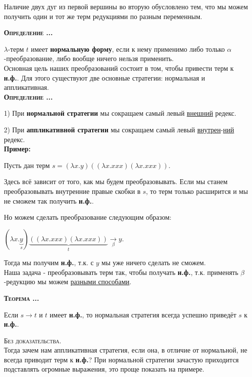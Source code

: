 \documentclass[18pt, a4paper]{extarticle}
\newcounter{par}
\newcounter{spar}
\newcounter{zap}
\newcommand{\opr}{\textbf{\textsc{Определение \thepar.\if\thespar1\thespar.\fi\thezap.\;}}\stepcounter{zap}}
\newcommand{\teor}{\textbf{\textsc{Теорема \thepar.\if\thespar1\thespar.\fi\thezap.\;}}\stepcounter{zap}}
\newcommand{\primer}{\textbf{Пример:\;}}
\newcommand{\bezdok}{\textsc{Без доказательства.}}
\newcommand{\lm}{\lambda}
\newcommand{\redb}{\underset{\beta}{\longrightarrow}}
\begin{document}
Наличие двух дуг из первой вершины во вторую обусловлено тем, что мы можем получить один и тот же терм редукциями по разным переменным.

\newpage

\opr 

$\lm$-терм $t$ имеет \textbf{нормальную форму}, если к нему применимо либо только $\alpha$-преобразование, либо вообще ничего нельзя применить.\\

Основная цель наших преобразований состоит в том, чтобы привести терм к \textbf{н.ф.}. Для этого существуют две основные стратегии: нормальная и аппликативная.\\

\opr

1) При \textbf{нормальной стратегии} мы сокращаем самый левый \underline{внешний} редекс.

2) При \textbf{аппликативной стратегии} мы сокращаем самый левый \underline{внутрен}-\underline{ний} редекс.\\

\primer

Пусть дан терм $s=(\lm x.y)((\lm x.xxx)(\lm x.xxx))$.

Здесь всё зависит от того, как мы будем преобразовывать. Если мы станем преобразовывать внутренние правые скобки в $s$, то терм только расширится и мы не сможем так получить \textbf{н.ф.}.

Но можем сделать преобразование следующим образом:

$(\lm x.\underset{s}{\underbrace{y}})\underset{t}{\underbrace{((\lm x.xxx)(\lm x.xxx))}}\redb y$.

Тогда мы получим \textbf{н.ф.}, т.к. с $y$ мы уже ничего сделать не сможем.\\

Наша задача - преобразовывать терм так, чтобы получать \textbf{н.ф.}, т.к. применять $\beta$-редукцию мы можем \underline{разными способами}.

\newpage

\teor 

Если $s\to t$ и $t$ имеет \textbf{н.ф.}, то нормальная стратегия всегда успешно приведёт $s$ к \textbf{н.ф.}.

\bezdok\\

Тогда зачем нам аппликативная стратегия, если она, в отличие от нормальной, не всегда приводит терм к \textbf{н.ф.}? При нормальной стратегии зачастую приходится подставлять огромные выражения, это проще показать на примере.
\end{document}
